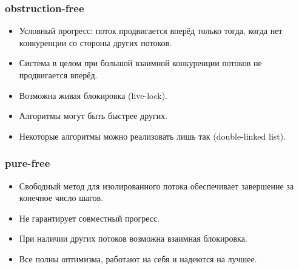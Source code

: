 \documentclass[aspectratio=169, pdf, 8pt, unicode]{beamer}
\begin{document}
\begin{frame}[fragile]
\frametitle{obstruction-free}
\begin{itemize}
    \item Условный прогресс: поток продвигается вперёд только тогда, когда нет конкуренции со стороны других потоков.
    \item Система в целом при большой взаимной конкуренции потоков не продвигается вперёд.
    \item Возможна живая блокировка (live-lock).
    \item Алгоритмы могут быть быстрее других.
    \item Некоторые алгоритмы можно реализовать лишь так (double-linked list).
\end{itemize}
\end{frame}

\begin{frame}[fragile]
\frametitle{pure-free}
\begin{itemize}
    \item Свободный метод для изолированного потока обеспечивает завершение за конечное число шагов.
    \item Не гарантирует совместный прогресс.
    \item При наличии других потоков возможна взаимная блокировка.
    \item Все полны оптимизма, работают на себя и надеются на лучшее.
\end{itemize}
\end{frame}
\end{document}
